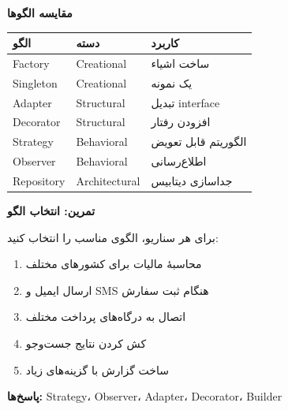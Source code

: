 \documentclass[14pt, a4paper, landscape]{extarticle}
\newcommand{\slide}[1]{%
    \newpage
    \begin{center}
    \begin{minipage}[t]{0.95\textwidth}
    \vspace{0.5cm}
    #1
    \vspace{0.5cm}
    \end{minipage}
    \end{center}
}
\newcommand{\slidetitle}[1]{%
    \begin{center}
        {\LARGE\bfseries\textcolor{primary}{#1}}
    \end{center}
    \vspace{0.5cm}
}
\begin{document}
\slide{
    \slidetitle{مقایسه الگوها}
    \vspace{0.3cm}
    \begin{center}
        \begin{tabular}{llp{6cm}}
            \toprule
            \textbf{الگو} & \textbf{دسته} & \textbf{کاربرد} \\
            \midrule
            Factory & Creational & ساخت اشیاء \\
            \hline
            Singleton & Creational & یک نمونه \\
            \hline
            Adapter & Structural & تبدیل interface \\
            \hline
            Decorator & Structural & افزودن رفتار \\
            \hline
            Strategy & Behavioral & الگوریتم قابل تعویض \\
            \hline
            Observer & Behavioral & اطلاع‌رسانی \\
            \hline
            Repository & Architectural & جداسازی دیتابیس \\
            \bottomrule
        \end{tabular}
    \end{center}
}

\slide{
    \slidetitle{تمرین: انتخاب الگو}
    \vspace{0.5cm}
    {\large برای هر سناریو، الگوی مناسب را انتخاب کنید:}
    \vspace{0.5cm}
    \begin{enumerate}[itemsep=0.4em]
        \item {\large محاسبهٔ مالیات برای کشورهای مختلف}
        \item {\large ارسال ایمیل و SMS هنگام ثبت سفارش}
        \item {\large اتصال به درگاه‌های پرداخت مختلف}
        \item {\large کش کردن نتایج جست‌وجو}
        \item {\large ساخت گزارش با گزینه‌های زیاد}
    \end{enumerate}
    \vspace{0.5cm}
    {\large\textbf{پاسخ‌ها:} Strategy، Observer، Adapter، Decorator، 
Builder}
}
\end{document}
